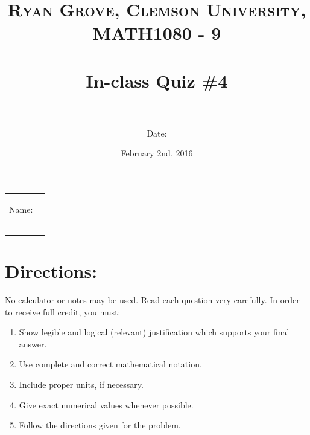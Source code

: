 \documentclass[paper=a4, fontsize=11pt]{scrartcl} %
\title{	
\normalfont \normalsize 
\textsc{Ryan Grove, Clemson University, MATH1080 - 9} \\ [25pt] %
\horrule{0.5pt} \\[0.4cm] %
\huge In-class Quiz \#4 \\ %
\horrule{2pt} \\[0.5cm] %
}
\author{Date:} %
\date{\normalsize February 2nd, 2016} %
\numberwithin{equation}{section} %
\numberwithin{figure}{section} %
\numberwithin{table}{section} %
\begin{document}
\maketitle %

\begin{flushleft}
\begin{tabular}{l l}
Name: \rule{3.2in}{.01cm}  & {}%
\end{tabular}
\end{flushleft}


\section*{\textbf{Directions:}}

No calculator or notes may be used.  Read each question very carefully.  In order to receive full credit, you must:
\begin{enumerate}
\item Show legible and logical (relevant) justification which supports your final answer.
\item Use complete and correct mathematical notation.
\item Include proper units, if necessary.
\item Give exact numerical values whenever possible.
\item Follow the directions given for the problem.
\end{enumerate}
\vspace{.1in}

\newpage
\end{document}
